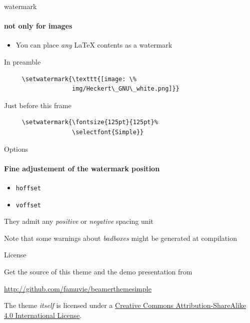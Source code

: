 \documentclass{beamer}
\begin{document}
\setwatermark{\fontsize{125pt}{125pt}\selectfont{Simple}}

\begin{frame}[fragile]{watermark}
  \framesubtitle{not only for images}

  \begin{itemize}
    \item You can place \emph{any} \LaTeX{} \alert{contents} as a watermark
  \end{itemize}

  \begin{block}{In preamble}
    \begin{verbatim}
     \setwatermark{\texttt{[image: \%
                   img/Heckert\_GNU\_white.png]}}
    \end{verbatim}
  \end{block}

  \begin{block}{Just before this frame}
    \begin{verbatim}
     \setwatermark{\fontsize{125pt}{125pt}%
                   \selectfont{Simple}}
    \end{verbatim}
  \end{block}


\end{frame}



\setwatermark[hoffset=-3cm,voffset=-2cm]{\fontsize{125pt}{125pt}\selectfont{Simple}}


\begin{frame}{Options}
  \framesubtitle{Fine adjustement of the watermark position}

  
  \begin{itemize}
    \item \texttt{hoffset}
    \item \texttt{voffset}
  \end{itemize}
  
  They admit any \emph{positive} or \emph{negative} spacing \alert{unit}
  
  Note that some \alert{warnings} about \emph{badboxes} might be generated at compilation

\end{frame}




\begin{frame}{License}

  \begin{block}{Get the source of this theme and the demo presentation from}

  \begin{center}\url{http://github.com/famuvie/beamerthemesimple}\end{center}

  \end{block}
  
  The theme \emph{itself} is licensed under a
  \href{http://creativecommons.org/licenses/by-sa/4.0/}{Creative Commons
  Attribution-ShareAlike 4.0 International License}.

  \begin{center}\ccbysa\end{center}

\end{frame}
\end{document}

